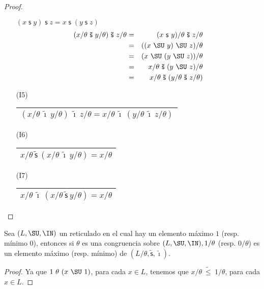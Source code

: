 \begin{proof}
\begin{multicols}{2}
\begin{enumerate}
          \((x\mathsf{\;s\;}y)\;\mathsf{s}\;z=x\;\mathsf{s}\;(y\;\mathsf{s} \;z)\)
          \begin{eqnarray*}
            (x/\theta \ \mathsf{\tilde{s}} \ y/\theta) \ \mathsf{\tilde{s}} \ z/\theta &=& (x \ \mathsf{s} \ y)/\theta \
              \mathsf{\tilde{s}} \ z/\theta \\
            &=& ((x \ \SU \ y) \ \SU \ z) /\theta \\
            &=& (x \ \SU \ (y \ \SU \ z)) /\theta \\
            &=& x/\theta \ \mathsf{\tilde{s}} \ (y \ \SU \ z) /\theta \\
            &=& x/\theta \ \mathsf{\tilde{s}} \ (y /\theta \ \mathsf{\tilde{s}} \ z/\theta)
          \end{eqnarray*}
        \item[(I5)] \begin{tabular}{|c|} \hline $(x/\theta \ \mathsf{\tilde{\imath}} \ y/\theta) \
          \mathsf{\tilde{\imath}} \ z/\theta = x/\theta \ \mathsf{\tilde{\imath}} \ (y/\theta \ \mathsf{\tilde{\imath}}
          \ z/\theta)$ \\\hline \end{tabular}
        \item[(I6)] \begin{tabular}{|c|} \hline $x/\theta \ \mathsf{\tilde{s}} \ (x/\theta \ \mathsf{\tilde{\imath}} \
          y/\theta) = x/\theta$ \\\hline \end{tabular}
        \item[(I7)] \begin{tabular}{|c|} \hline $x/\theta \ \mathsf{\tilde{\imath}} \ (x/\theta \ \mathsf{\tilde{s}} \
          y/\theta) = x/\theta$ \\\hline \end{tabular}
      \end{enumerate}
    \end{multicols}
  \end{proof}

  \begin{corollary}
    \PN Sea $(L, \SU, \IN)$ un reticulado en el cual hay un elemento máximo $1$ (resp. mínimo $0$), entonces si $\theta$
    es una congruencia sobre $(L, \SU, \IN), 1/\theta$ (resp. $0/\theta$) es un elemento máximo (resp. mínimo) de
    $(L/\theta, \mathsf{\tilde{s}}, \mathsf{\tilde{\imath}})$.
  \end{corollary}
  \begin{proof}
    \PN Ya que $1 \ \theta \ (x \ \SU \ 1)$, para cada $x \in L$, tenemos que $x/\theta \ \tilde{\leq} \ 1/\theta$, para
    cada $x \in L$.
  \end{proof}

